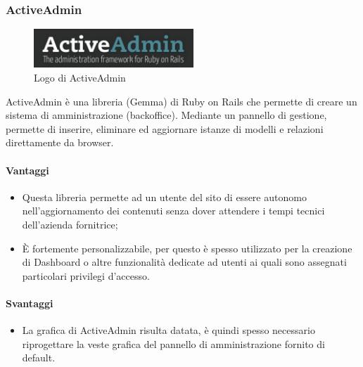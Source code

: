 \subsubsection{ActiveAdmin}

\begin{figure}[H]
\begin{center}
\includegraphics[width=6cm]{Pics/ActiveAdmin_logo.png}
\caption{Logo di ActiveAdmin}
\label{fig:ActiveAdminLogo}
\end{center}
\end{figure}
ActiveAdmin è una libreria (Gemma) di Ruby on Rails che permette di creare un sistema di amministrazione (backoffice). Mediante un pannello di gestione, permette di inserire, eliminare ed aggiornare istanze di modelli e relazioni direttamente da browser. 
\paragraph{Vantaggi}
\begin{itemize}
	\item Questa libreria permette ad un utente del sito di essere autonomo nell'aggiornamento dei contenuti senza dover attendere i tempi tecnici dell'azienda fornitrice;
	\item È fortemente personalizzabile, per questo è spesso utilizzato per la creazione di Dashboard o altre funzionalità dedicate ad utenti ai quali sono assegnati particolari privilegi d'accesso.
\end{itemize}
\paragraph{Svantaggi}
\begin{itemize}
	\item La grafica di ActiveAdmin risulta datata, è quindi spesso necessario riprogettare la veste grafica del pannello di amministrazione fornito di default.
\end{itemize}
